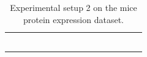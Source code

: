 \documentclass{tufte-book}
\begin{document}
\begin{table}[]
\begin{tabular}{cccccccccccccccc}
                        &                                                                                               &                             &                                       &                             &                                       &                             &                                       &                             &                                       &                             &                                       &  &  &  &  \\
                        &                                                                                               &                             &                                       &                             &                                       &                             &                                       &                             &                                       &                             &                                       &  &  &  &  \\
                        &                                                                                               &                             &                                       &                             &                                       &                             &                                       &                             &                                       &                             &                                       &  &  &  &  \\
                        &                                                                                               &                             &                                       &                             &                                       &                             &                                       &                             &                                       &                             &                                       &  &  &  &  \\
                        &                                                                                               &                             &                                       &                             &                                       &                             &                                       &                             &                                       &                             &                                       &  &  &  &  \\
                        &                                                                                               &                             &                                       &                             &                                       &                             &                                       &                             &                                       &                             &                                       &  &  &  & 
\caption{Experimental setup 2 on the mice protein expression dataset.}
			\end{tabular}
\end{table}
\end{document}
